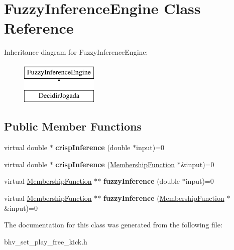 \hypertarget{classFuzzyInferenceEngine}{
\section{FuzzyInferenceEngine Class Reference}
\label{classFuzzyInferenceEngine}
}
Inheritance diagram for FuzzyInferenceEngine:\begin{figure}[H]
\begin{center}
\leavevmode
\includegraphics[height=2.000000cm]{classFuzzyInferenceEngine}
\end{center}
\end{figure}
\subsection*{Public Member Functions}
\begin{DoxyCompactItemize}
\item 
\hypertarget{classFuzzyInferenceEngine_aac0f7b4893abeb320267afd8bb8ba4ce}{
virtual double $\ast$ {\bfseries crispInference} (double $\ast$input)=0}
\label{classFuzzyInferenceEngine_aac0f7b4893abeb320267afd8bb8ba4ce}

\item 
\hypertarget{classFuzzyInferenceEngine_afbeaff0eb2d141eb1d099e7aa290ec61}{
virtual double $\ast$ {\bfseries crispInference} (\hyperlink{classMembershipFunction}{MembershipFunction} $\ast$\&input)=0}
\label{classFuzzyInferenceEngine_afbeaff0eb2d141eb1d099e7aa290ec61}

\item 
\hypertarget{classFuzzyInferenceEngine_a11728f735032b347807ef34693e08d48}{
virtual \hyperlink{classMembershipFunction}{MembershipFunction} $\ast$$\ast$ {\bfseries fuzzyInference} (double $\ast$input)=0}
\label{classFuzzyInferenceEngine_a11728f735032b347807ef34693e08d48}

\item 
\hypertarget{classFuzzyInferenceEngine_a176e2d172c445aeff80203b7568c1c48}{
virtual \hyperlink{classMembershipFunction}{MembershipFunction} $\ast$$\ast$ {\bfseries fuzzyInference} (\hyperlink{classMembershipFunction}{MembershipFunction} $\ast$\&input)=0}
\label{classFuzzyInferenceEngine_a176e2d172c445aeff80203b7568c1c48}

\end{DoxyCompactItemize}


The documentation for this class was generated from the following file:\begin{DoxyCompactItemize}
\item 
bhv\_\-set\_\-play\_\-free\_\-kick.h\end{DoxyCompactItemize}
